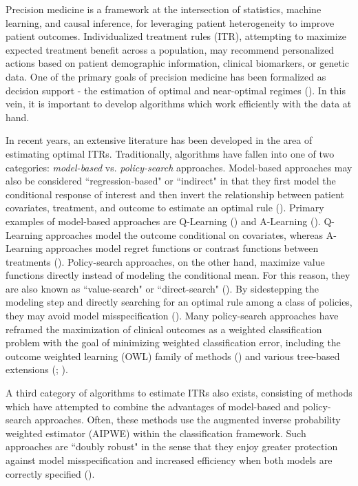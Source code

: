 \documentclass[useAMS,usenatbib]{biom}
\begin{document}
Precision medicine is a framework at the intersection of statistics, machine learning, and causal inference, for leveraging patient heterogeneity to improve
patient outcomes. Individualized treatment rules (ITR), attempting to maximize expected treatment benefit across a population, may recommend personalized actions based on patient demographic information, clinical biomarkers, or genetic data. One of the primary goals of precision medicine has been formalized as decision support - the estimation of optimal and near-optimal regimes (\cite{kosorok_precision_2019}). In this vein, it is important to develop algorithms which work efficiently with the data at hand.

In recent years, an extensive literature has been developed in the area of estimating optimal ITRs. Traditionally, algorithms have fallen into one of two categories: \textit{model-based} vs. \textit{policy-search} approaches. Model-based approaches may also be considered ``regression-based" or ``indirect" in that they first model the conditional response of interest and then invert the relationship between patient covariates, treatment, and outcome to estimate an optimal rule (\cite{kosorok_adaptive_2016}). Primary examples of model-based approaches are Q-Learning (\cite{qian_performance_2011}) and A-Learning (\cite{murphy_optimal_2003, robins_optimal_2004}). Q-Learning approaches model the outcome conditional on covariates, whereas A-Learning approaches model regret functions or contrast functions between treatments (\cite{schulte_q-_2014}). Policy-search approaches, on the other hand, maximize value functions directly instead of modeling the conditional mean. For this reason, they are also known as ``value-search" or ``direct-search" (\cite{kosorok_adaptive_2016}). By sidestepping the modeling step and directly searching for an optimal rule among a class of policies, they may avoid model misspecification (\cite{xiao_robust_2019}). Many policy-search approaches have reframed the maximization of clinical outcomes as a weighted classification problem with the goal of minimizing weighted classification error, including the outcome weighted learning (OWL) family of methods (\cite{zhao_estimating_2012, zhou_residual_2017, zhang_multicategory_2020}) and various tree-based extensions (\cite*{cui_tree_2017}; \cite{kallus_balanced_2018, zhu_greedy_2017}).

A third category of algorithms to estimate ITRs also exists, consisting of methods which have attempted to combine the advantages of model-based and policy-search approaches. Often, these methods use the augmented inverse probability weighted estimator (AIPWE) within the classification framework. Such approaches are ``doubly robust" in the sense that they enjoy greater protection against model misspecification and increased efficiency when both models are correctly specified (\cite{zhao_efficient_2019, zhang_c-learning_2018, liu_augmented_2018}). 
\end{document}
